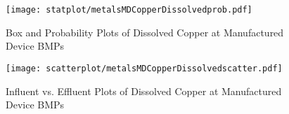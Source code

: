         \begin{figure}[hb]   %
            \centering
            \texttt{[image: statplot/metalsMDCopperDissolvedprob.pdf]}
            \caption{Box and Probability Plots of Dissolved Copper at Manufactured Device BMPs}
        \end{figure}         %
        
        
        \begin{figure}[hb]   %
            \centering
            \texttt{[image: scatterplot/metalsMDCopperDissolvedscatter.pdf]}
            \caption{Influent vs. Effluent Plots of Dissolved Copper at Manufactured Device BMPs}
        \end{figure}         %
        \clearpage
        